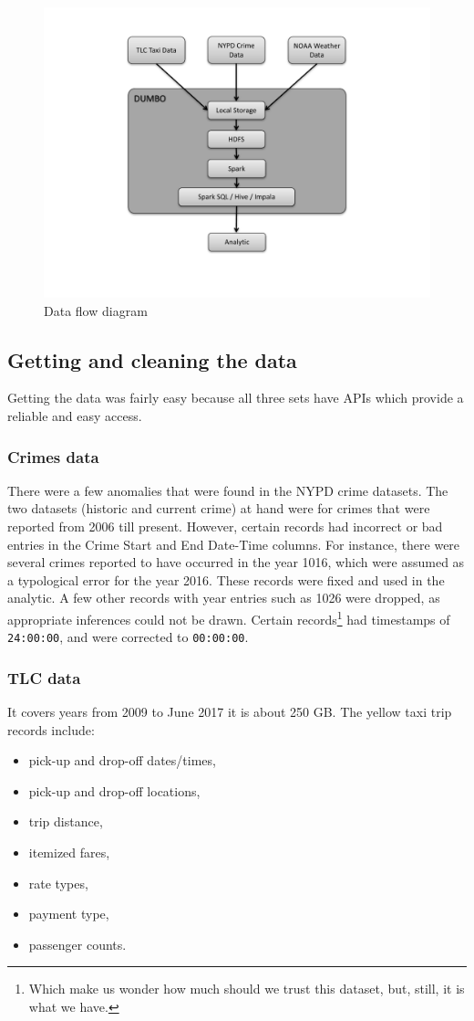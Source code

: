 \documentclass{sigkddExp}
\begin{document}
\begin{figure}
\caption{Data flow diagram}
\label{figx}
\centering \includegraphics[width=.45\textwidth]{images/DesignFlowDiagram.pdf}
\end{figure}


\subsection{Getting and cleaning the data}

Getting the data was fairly easy because all three sets have APIs which provide a reliable and easy access.

\subsubsection{Crimes data}
There were a few anomalies that were found in the NYPD crime datasets. The two datasets (historic and current crime) at hand were for crimes that were reported from 2006 till present. However, certain records had incorrect or bad entries in the Crime Start and End Date-Time columns. For instance, there were several crimes reported to have occurred in the year 1016, which were assumed as a typological error for the year 2016. These records were fixed and used in the analytic. A few other records with year entries such as 1026 were dropped, as appropriate inferences could not be drawn. Certain records\footnote{Which make us wonder how much should we trust this dataset, but, still, it is what we have.} had timestamps of \texttt{24:00:00}, and were corrected to \texttt{00:00:00}.

\subsubsection{TLC data}

It covers years from 2009 to June 2017  it is about 250 GB. The yellow taxi trip records include:

\begin{itemize}
\item pick-up and drop-off dates/times, 
\item pick-up and drop-off locations, 
\item trip distance,
\item itemized fares, 
\item rate types, 
\item payment type, 
\item passenger counts. 
\end{itemize}
\end{document}
